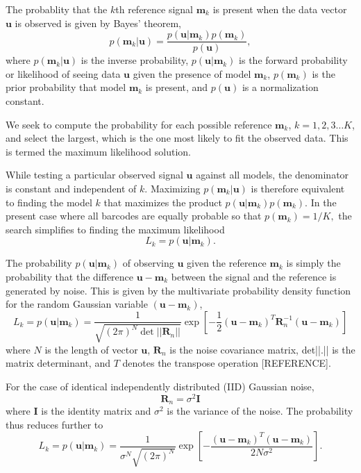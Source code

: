 The probablity that the $k$th reference signal $\mathbf{m}_k$ is present when the data vector $\mathbf{u}$ is observed is given by Bayes' theorem,
\begin{equation}\label{eq:Bayes}
p(\mathbf{m}_k|\mathbf{u}) = \frac{p(\mathbf{u}|\mathbf{m}_k)p(\mathbf{m}_k)} {p(\mathbf{u})},
\end{equation}
where $p(\mathbf{m}_k|\mathbf{u})$ is the inverse probability, $p(\mathbf{u}|\mathbf{m}_k)$ is the forward probability or likelihood of seeing data $\mathbf{u}$ given the presence of model $\mathbf{m}_k$, $p(\mathbf{m}_k)$ is the prior probability that model $\mathbf{m}_k$ is present, and $p(\mathbf{u})$ is a normalization constant.

We seek to compute the probability for each possible reference $\mathbf{m}_k$, $k=1,2,3 \ldots K$, and select the largest, which is the one most likely to fit the observed data. This is termed the maximum likelihood solution.

While testing a particular observed signal $\mathbf{u}$ against all models, the denominator is constant and independent of $k$. Maximizing $p(\mathbf{m}_k|\mathbf{u})$ is therefore equivalent to finding the model $k$ that maximizes the product  $p(\mathbf{u}|\mathbf{m}_k)p(\mathbf{m}_k)$.
In the present case where all barcodes are equally probable so that
$p(\mathbf{m}_k)=1/K,$ 
the search simplifies to finding the maximum likelihood 
\begin{equation}
L_k = p(\mathbf{u}|\mathbf{m}_k).
\end{equation}



The probability $p(\mathbf{u}|\mathbf{m}_k)$ of observing $\mathbf{u}$ given the reference $\mathbf{m}_k$ is simply the probability that the difference $\mathbf{u}-\mathbf{m}_k$ between the signal and the reference is generated by noise. This is given by the multivariate probability density function for the random Gaussian variable $(\mathbf{u}-\mathbf{m}_k)$, 
\begin{equation}\label{eq:Main}
L_k = p(\mathbf{u}|\mathbf{m}_k) = \frac{1}{  \sqrt{ (2\pi)^N \det || \mathbf{R}_n||} } \exp\left[ -\frac{1}{2}  (\mathbf{u}-\mathbf{m}_k)^T \mathbf{R}_n^{-1} (\mathbf{u}-\mathbf{m}_k) \right]
\end{equation}
where $N$ is the length of vector $\mathbf{u}$, $\mathbf{R}_n$ is the noise covariance matrix, det||.|| is the matrix determinant, and $T$ denotes the transpose operation [REFERENCE].
 
For the case of identical independently distributed (IID) Gaussian noise, 
\begin{equation}
\mathbf{R}_n=\sigma^2 \mathbf{I}
\end{equation}
where $\mathbf{I}$ is the identity matrix and $\sigma^2$ is the variance of the noise. The probability thus reduces further to
\begin{equation}\label{eq:iidEnergy}
L_k = p(\mathbf{u}|\mathbf{m}_k) = \frac{1}{  \sigma^N \sqrt{ (2\pi)^N}   } \exp\left[ -\frac{(\mathbf{u}-\mathbf{m}_k)^T(\mathbf{u}-\mathbf{m}_k)} {2 N \sigma^2 } \right].
\end{equation}


